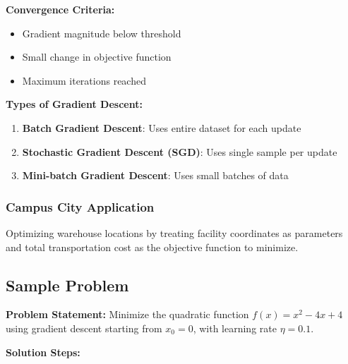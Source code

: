 \documentclass[
  letterpaper,
  DIV=11,
  numbers=noendperiod]{scrreprt}
\providecommand{\tightlist}{%
  \setlength{\itemsep}{0pt}\setlength{\parskip}{0pt}}
\begin{document}
\textbf{Convergence Criteria:}

\begin{itemize}
\tightlist
\item
  Gradient magnitude below threshold
\item
  Small change in objective function
\item
  Maximum iterations reached
\end{itemize}

\textbf{Types of Gradient Descent:}

\begin{enumerate}
\def\labelenumi{\arabic{enumi}.}
\tightlist
\item
  \textbf{Batch Gradient Descent}: Uses entire dataset for each update
\item
  \textbf{Stochastic Gradient Descent (SGD)}: Uses single sample per
  update
\item
  \textbf{Mini-batch Gradient Descent}: Uses small batches of data
\end{enumerate}

\subsubsection{Campus City Application}\label{campus-city-application}

Optimizing warehouse locations by treating facility coordinates as
parameters and total transportation cost as the objective function to
minimize.

\subsection{Sample Problem}\label{sample-problem-17}

\textbf{Problem Statement:} Minimize the quadratic function
\(f(x) = x^2 - 4x + 4\) using gradient descent starting from
\(x_0 = 0\), with learning rate \(\eta = 0.1\).

\textbf{Solution Steps:}
\end{document}
